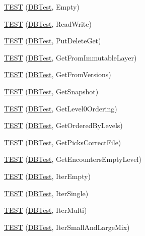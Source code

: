 \begin{DoxyCompactItemize}
\item 
\hyperlink{namespaceleveldb_a5cdb2a977033415260acc09b4b1b7171}{T\-E\-S\-T} (\hyperlink{classleveldb_1_1_d_b_test}{D\-B\-Test}, Empty)
\item 
\hyperlink{namespaceleveldb_a2d427ecc9d7b712d8c5dd7ec8b6343fc}{T\-E\-S\-T} (\hyperlink{classleveldb_1_1_d_b_test}{D\-B\-Test}, Read\-Write)
\item 
\hyperlink{namespaceleveldb_a4d273f5f0d313440832363179e28e010}{T\-E\-S\-T} (\hyperlink{classleveldb_1_1_d_b_test}{D\-B\-Test}, Put\-Delete\-Get)
\item 
\hyperlink{namespaceleveldb_a21cac1755bd447df075909132bb964d4}{T\-E\-S\-T} (\hyperlink{classleveldb_1_1_d_b_test}{D\-B\-Test}, Get\-From\-Immutable\-Layer)
\item 
\hyperlink{namespaceleveldb_affd937ddc8c138fd0b5d020a396310c8}{T\-E\-S\-T} (\hyperlink{classleveldb_1_1_d_b_test}{D\-B\-Test}, Get\-From\-Versions)
\item 
\hyperlink{namespaceleveldb_ad6fac95495278565df640d4055b9c9f0}{T\-E\-S\-T} (\hyperlink{classleveldb_1_1_d_b_test}{D\-B\-Test}, Get\-Snapshot)
\item 
\hyperlink{namespaceleveldb_a2b333e6a496f74899c808279627f11a0}{T\-E\-S\-T} (\hyperlink{classleveldb_1_1_d_b_test}{D\-B\-Test}, Get\-Level0\-Ordering)
\item 
\hyperlink{namespaceleveldb_a8f54952904ed501131060691eb1b6970}{T\-E\-S\-T} (\hyperlink{classleveldb_1_1_d_b_test}{D\-B\-Test}, Get\-Ordered\-By\-Levels)
\item 
\hyperlink{namespaceleveldb_ac3d2a0e1b8553c3106c45ead7d6804bb}{T\-E\-S\-T} (\hyperlink{classleveldb_1_1_d_b_test}{D\-B\-Test}, Get\-Picks\-Correct\-File)
\item 
\hyperlink{namespaceleveldb_a0cec95f588ef6c5c121ac0d63eb4238f}{T\-E\-S\-T} (\hyperlink{classleveldb_1_1_d_b_test}{D\-B\-Test}, Get\-Encounters\-Empty\-Level)
\item 
\hyperlink{namespaceleveldb_a5ad106e9bbfcb5520b7dc344525f7cd2}{T\-E\-S\-T} (\hyperlink{classleveldb_1_1_d_b_test}{D\-B\-Test}, Iter\-Empty)
\item 
\hyperlink{namespaceleveldb_a8a6d5f729259c0f357f4dee533a5ce6a}{T\-E\-S\-T} (\hyperlink{classleveldb_1_1_d_b_test}{D\-B\-Test}, Iter\-Single)
\item 
\hyperlink{namespaceleveldb_a683bc77ccfd830fbe21a91c26ac91347}{T\-E\-S\-T} (\hyperlink{classleveldb_1_1_d_b_test}{D\-B\-Test}, Iter\-Multi)
\item 
\hyperlink{namespaceleveldb_a4044ccda7237640864995a0885ea6710}{T\-E\-S\-T} (\hyperlink{classleveldb_1_1_d_b_test}{D\-B\-Test}, Iter\-Small\-And\-Large\-Mix)

\end{DoxyCompactItemize}
